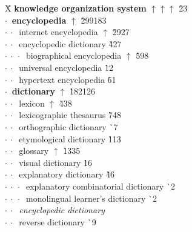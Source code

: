 \begin{tabbing}
\hspace*{58mm}X\= \kill
 \textbf{knowledge organization system} $\uparrow\uparrow\uparrow$ \` 2{\raisebox{.4\height}{\scalebox{.6}{+}}}3\\
$\cdot\:$  \textbf{encyclopedia} $\uparrow$ \` 299{\raisebox{.4\height}{\scalebox{.6}{+}}}183\\
$\cdot\:\cdot\:$  internet encyclopedia $\uparrow$ \` 29{\raisebox{.4\height}{\scalebox{.6}{+}}}27\\
$\cdot\:\cdot\:$  encyclopedic dictionary  \` 42{\raisebox{.4\height}{\scalebox{.6}{+}}}7\\
$\cdot\:\cdot\:\cdot\:$  biographical encyclopedia $\uparrow$ \` 59{\raisebox{.4\height}{\scalebox{.6}{+}}}8\\
$\cdot\:\cdot\:$  universal encyclopedia  \` 1{\raisebox{.4\height}{\scalebox{.6}{+}}}2\\
$\cdot\:\cdot\:$  hypertext encyclopedia  \` 6{\raisebox{.4\height}{\scalebox{.6}{+}}}1\\
$\cdot\:$  \textbf{dictionary} $\uparrow$ \` 182{\raisebox{.4\height}{\scalebox{.6}{+}}}126\\
$\cdot\:\cdot\:$  lexicon $\uparrow$ \` 4{\raisebox{.4\height}{\scalebox{.6}{+}}}38\\
$\cdot\:\cdot\:$  lexicographic thesaurus  \` 7{\raisebox{.4\height}{\scalebox{.6}{+}}}48\\
$\cdot\:\cdot\:$  orthographic dictionary  \` {\raisebox{.4\height}{\scalebox{.6}{+}}}7\\
$\cdot\:\cdot\:$  etymological dictionary  \` 1{\raisebox{.4\height}{\scalebox{.6}{+}}}13\\
$\cdot\:\cdot\:$  glossary $\uparrow$ \` 13{\raisebox{.4\height}{\scalebox{.6}{+}}}35\\
$\cdot\:\cdot\:$  visual dictionary  \` 1{\raisebox{.4\height}{\scalebox{.6}{+}}}6\\
$\cdot\:\cdot\:$  explanatory dictionary  \` 4{\raisebox{.4\height}{\scalebox{.6}{+}}}6\\
$\cdot\:\cdot\:\cdot\:$  explanatory combinatorial dictionary  \` {\raisebox{.4\height}{\scalebox{.6}{+}}}2\\
$\cdot\:\cdot\:\cdot\:$  monolingual learner's dictionary  \` {\raisebox{.4\height}{\scalebox{.6}{+}}}2\\
$\cdot\:\cdot\:$  \textit{encyclopedic dictionary}\\
$\cdot\:\cdot\:$  reverse dictionary  \` {\raisebox{.4\height}{\scalebox{.6}{+}}}9\\

\end{tabbing}
